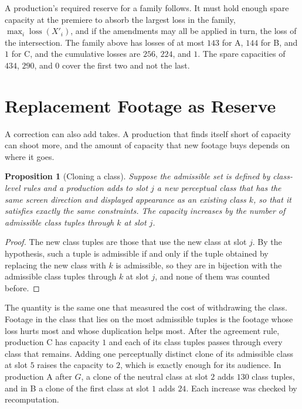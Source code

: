 \documentclass[11pt,twoside,openright]{book}
\theoremstyle{plain}
\newtheorem{proposition}[theorem]{Proposition}
\theoremstyle{definition}
\theoremstyle{remark}
\DeclareMathOperator{\loss}{loss}
\begin{document}
A production's required reserve for a family follows. It must hold enough spare capacity at the premiere to absorb the largest loss in the family, $\max_i\loss(X'_i)$, and if the amendments may all be applied in turn, the loss of the intersection. The family above has losses of at most $143$ for A, $144$ for B, and $1$ for C, and the cumulative losses are $256$, $224$, and $1$. The spare capacities of $434$, $290$, and $0$ cover the first two and not the last.

\section{Replacement Footage as Reserve}\label{sec:reserve}

A correction can also add takes. A production that finds itself short of capacity can shoot more, and the amount of capacity that new footage buys depends on where it goes.

\begin{proposition}[Cloning a class]\label{prop:clone}
Suppose the admissible set is defined by class-level rules and a production adds to slot $j$ a new perceptual class that has the same screen direction and displayed appearance as an existing class $k$, so that it satisfies exactly the same constraints. The capacity increases by the number of admissible class tuples through $k$ at slot $j$.
\end{proposition}

\begin{proof}
The new class tuples are those that use the new class at slot $j$. By the hypothesis, such a tuple is admissible if and only if the tuple obtained by replacing the new class with $k$ is admissible, so they are in bijection with the admissible class tuples through $k$ at slot $j$, and none of them was counted before.
\end{proof}

The quantity is the same one that measured the cost of withdrawing the class. Footage in the class that lies on the most admissible tuples is the footage whose loss hurts most and whose duplication helps most. After the agreement rule, production C has capacity $1$ and each of its class tuples passes through every class that remains. Adding one perceptually distinct clone of its admissible class at slot $5$ raises the capacity to $2$, which is exactly enough for its audience. In production A after $G$, a clone of the neutral class at slot $2$ adds $130$ class tuples, and in B a clone of the first class at slot $1$ adds $24$. Each increase was checked by recomputation.
\end{document}
